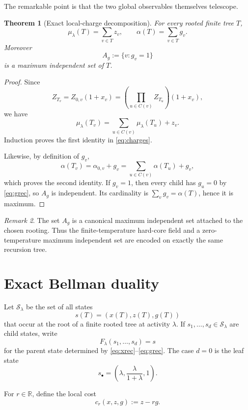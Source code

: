 \documentclass[11pt,a4paper]{article}
\newtheorem{theorem}{Theorem}
\theoremstyle{definition}
\theoremstyle{remark}
\newtheorem{remark}[theorem]{Remark}
\newcommand{\Sset}{\mathscr S}
\newcommand{\1}{\mathbf 1}
\begin{document}
The remarkable point is that the two global observables themselves telescope.

\begin{theorem}[Exact local-charge decomposition]
\label{thm:charges}
For every rooted finite tree $T$,
\begin{equation}
  \boxed{
  \mu_\lambda(T)=\sum_{v\in T}z_v,
  \qquad
  \alpha(T)=\sum_{v\in T}g_v.}
  \label{eq:charges}
\end{equation}
Moreover
\[
  A_g:=\{v:g_v=1\}
\]
is a maximum independent set of $T$.
\end{theorem}

\begin{proof}
Since
\[
  Z_{T_v}
  =Z_{0,v}(1+x_v)
  =\left(\prod_{u\in C(v)}Z_{T_u}\right)(1+x_v),
\]
we have
\[
  \mu_\lambda(T_v)
  =\sum_{u\in C(v)}\mu_\lambda(T_u)+z_v.
\]
Induction proves the first identity in \eqref{eq:charges}.

Likewise, by definition of $g_v$,
\[
  \alpha(T_v)=\alpha_{0,v}+g_v
  =\sum_{u\in C(v)}\alpha(T_u)+g_v,
\]
which proves the second identity.  If $g_v=1$, then every child has $g_u=0$ by
\eqref{eq:grec}, so $A_g$ is independent.  Its cardinality is $\sum_v g_v=\alpha(T)$,
hence it is maximum.
\end{proof}

\begin{remark}
The set $A_g$ is a canonical maximum independent set attached to the chosen rooting.
Thus the finite-temperature hard-core field and a zero-temperature maximum independent set
are encoded on exactly the same recursion tree.
\end{remark}

\section{Exact Bellman duality}

Let $\Sset_\lambda$ be the set of all states
\[
  s(T)=(x(T),z(T),g(T))
\]
that occur at the root of a finite rooted tree at activity $\lambda$.  If
$s_1,\dots,s_d\in\Sset_\lambda$ are child states, write
\[
  F_\lambda(s_1,\dots,s_d)=s
\]
for the parent state determined by \eqref{eq:xrec}--\eqref{eq:grec}.  The case $d=0$
is the leaf state
\begin{equation}
  s_\bullet
  =\left(\lambda,\frac{\lambda}{1+\lambda},1\right).
  \label{eq:leaf}
\end{equation}

For $r\in\mathbb R$, define the local cost
\begin{equation}
  c_r(x,z,g):=z-rg.
  \label{eq:local-cost}
\end{equation}
\end{document}

